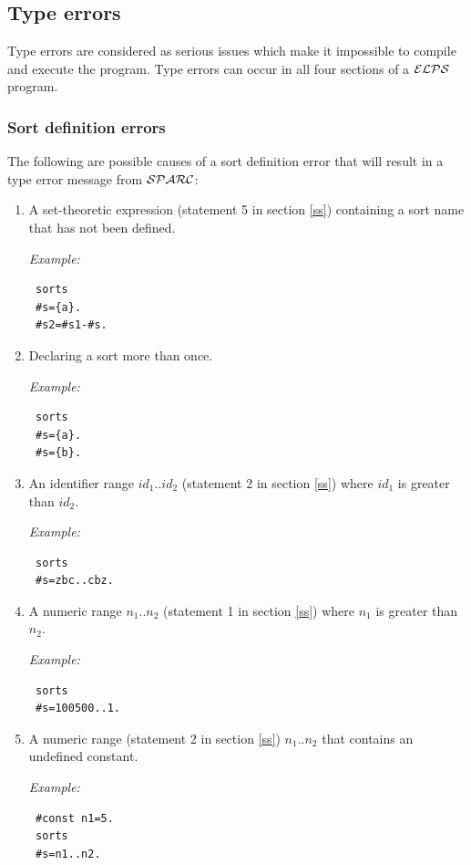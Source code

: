 \documentclass[12pt, letterpaper]{article}
\begin{document}
\subsection{Type errors}
Type errors are considered as serious issues which make it  impossible to compile and execute the program.
Type errors can occur in all four sections of a ${\cal ELPS}$ program.
\subsubsection{Sort definition errors}
The following are possible causes of a sort definition error  that will result in a type error  message from ${\cal SPARC}$:
\begin{enumerate}
\item  A set-theoretic expression (statement 5 in section \ref{ss}) containing a sort name that has not been defined.

\textit{Example:}
\begin{verbatim}
 sorts
 #s={a}.
 #s2=#s1-#s.
\end{verbatim}

\item  Declaring a sort more than once.

\textit{Example:}
\begin{verbatim}
 sorts
 #s={a}.
 #s={b}.
\end{verbatim}

\item An identifier range $id_1..id_2$ (statement 2 in section \ref{ss}) where $id_1$ is greater than $id_2$.

\textit{Example:}
\begin{verbatim}
 sorts
 #s=zbc..cbz.
\end{verbatim}

\item A numeric range $n_1..n_2$ (statement 1 in section \ref{ss}) where  $n_1$ is greater than $n_2$.

\textit{Example:}
\begin{verbatim}
 sorts
 #s=100500..1.
\end{verbatim}


\item A numeric range (statement 2 in section \ref{ss}) $n_1..n_2$ that  contains an undefined constant.

\textit{Example:}
\begin{verbatim}
 #const n1=5.
 sorts
 #s=n1..n2.
\end{verbatim}


\end{enumerate}
\end{document}
